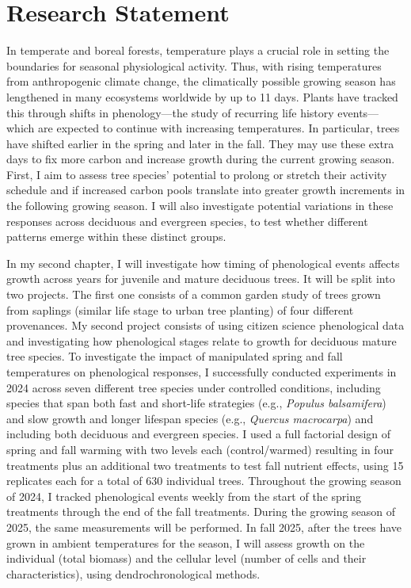\documentclass[11pt,letter]{article}
\begin{document}
\section {Research Statement}
In temperate and boreal forests, temperature plays a crucial role in setting the boundaries for seasonal physiological activity. Thus, with rising temperatures from anthropogenic climate change, the climatically possible growing season has lengthened in many ecosystems worldwide by up to 11 days. Plants have tracked this through shifts in phenology—the study of recurring life history events—which are expected to continue with increasing temperatures. In particular, trees have shifted earlier in the spring and later in the fall. They may use these extra days to fix more carbon and increase growth during the current growing season.\\
First, I aim to assess tree species’ potential to prolong or stretch their activity schedule and if increased carbon pools translate into greater growth increments in the following growing season. I will also investigate potential variations in these responses across
deciduous and evergreen species, to test whether different patterns emerge within these distinct groups.
\par 
In my second chapter, I will investigate how timing of phenological events affects growth across years for juvenile and mature deciduous trees. It will be split into two projects. The first one consists of a common garden study of trees grown from saplings (similar life stage to urban tree planting) of four different provenances. My second project consists of using citizen science phenological data and investigating how phenological stages relate to growth for deciduous mature tree species. 
To investigate the impact of manipulated spring and fall temperatures on phenological responses, I successfully conducted experiments in 2024 across seven different tree species under controlled conditions, including species that span both fast and short-life strategies (e.g., \textit{Populus balsamifera}) and slow growth and longer lifespan species (e.g., \textit{Quercus macrocarpa}) and including both deciduous and evergreen species. I used a full factorial design of spring and fall warming with two levels each (control/warmed) resulting in four treatments plus an additional two treatments to test fall nutrient effects, using 15 replicates each for a total of 630 individual trees. Throughout the growing season of 2024, I tracked phenological events weekly from the start of the spring treatments through the end of the fall treatments. During the growing season of 2025, the same measurements will be performed. In fall 2025, after the trees have grown in ambient temperatures for the season, I will assess growth on the individual (total biomass) and the cellular level (number of cells and their characteristics), using dendrochronological methods.
\end{document}
